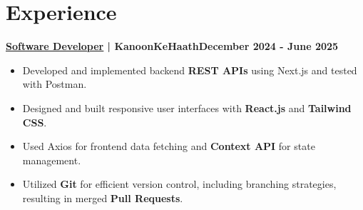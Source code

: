 \documentclass[letterpaper,10pt]{article}
\begin{document}
\begin{itemize}





\end{itemize}

\section*{Experience}
\textbf{\underline{\href{https://res.cloudinary.com/dle5gmw0f/image/upload/v1751134880/kkhcertificate_ivbe5w.png}{Software Developer}} | KanoonKeHaath}\hfill \small \textbf{December 2024 - June 2025}\\[-0.5em] %
\begin{itemize}\setlength{\itemsep}{0pt} %
    \item Developed and implemented backend \textbf{REST APIs} using Next.js and tested with Postman.
    \item Designed and built responsive user interfaces with \textbf{React.js} and \textbf{Tailwind CSS}.
    \item Used Axios for frontend data fetching and \textbf{Context API} for state management.
    \item Utilized \textbf{Git} for efficient version control, including branching strategies, resulting in merged \textbf{Pull Requests}.
\end{itemize}
\end{document}
